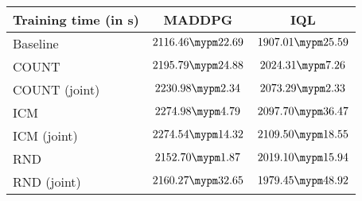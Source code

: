 \begin{tabular}{l | c c}
	Training time (in s) & MADDPG & IQL\\ \toprule
		Baseline & $2116.46 \mypm 22.69$ & $1907.01 \mypm 25.59$ \\ \midrule
	COUNT & $2195.79 \mypm 24.88$ & $2024.31 \mypm 7.26$ \\
	COUNT (joint) & $2230.98 \mypm 2.34$ & $2073.29 \mypm 2.33$ \\\midrule
	ICM & $2274.98 \mypm 4.79$ & $2097.70 \mypm 36.47$ \\
	ICM (joint) & $2274.54 \mypm 14.32$ & $2109.50 \mypm 18.55$ \\\midrule
	RND & $2152.70 \mypm 1.87$ & $2019.10 \mypm 15.94$ \\
	RND (joint) & $2160.27 \mypm 32.65$ & $1979.45 \mypm 48.92$ \\\midrule
\end{tabular}
